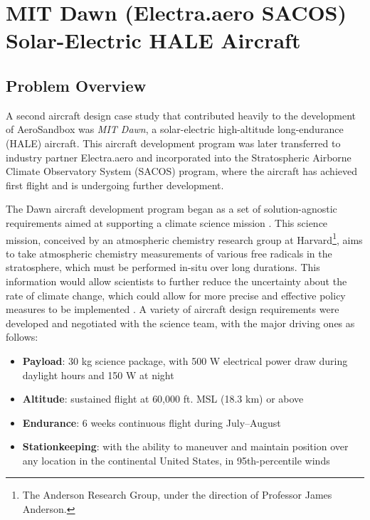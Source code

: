 \section{MIT Dawn (Electra.aero SACOS) Solar-Electric HALE Aircraft} %
\label{sec:dawn}

\subsection{Problem Overview}

A second aircraft design case study that contributed heavily to the development of AeroSandbox was \emph{MIT Dawn}, a solar-electric high-altitude long-endurance (HALE) aircraft. This aircraft development program was later transferred to industry partner Electra.aero and incorporated into the Stratospheric Airborne Climate Observatory System (SACOS) program, where the aircraft has achieved first flight and is undergoing further development.

The Dawn aircraft development program began as a set of solution-agnostic requirements aimed at supporting a climate science mission \cite{dewald_multidisciplinary_2023, sharpe_optimization_2021, avery_16_}. This science mission, conceived by an atmospheric chemistry research group at Harvard\footnote{The Anderson Research Group, under the direction of Professor James Anderson.}, aims to take atmospheric chemistry measurements of various free radicals in the stratosphere, which must be performed in-situ over long durations. This information would allow scientists to further reduce the uncertainty about the rate of climate change, which could allow for more precise and effective policy measures to be implemented \cite{dykema_feasibility_2023}. A variety of aircraft design requirements were developed and negotiated with the science team, with the major driving ones as follows:

\begin{itemize}[noitemsep]
    \item \textbf{Payload}: 30 kg science package, with 500 W electrical power draw during daylight hours and 150 W at night
    \item \textbf{Altitude}: sustained flight at 60,000 ft. MSL (18.3 km) or above
    \item \textbf{Endurance}: 6 weeks continuous flight during July–August
    \item \textbf{Stationkeeping}: with the ability to maneuver and maintain position over any location in the continental United States, in 95th-percentile winds
\end{itemize}

